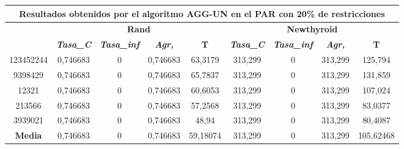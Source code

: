 \documentclass[12pt, spanish]{article}
\begin{document}
\begin{table}[H]
\footnotesize

\begin{tabular}{|c|c|c|c|c|c|c|c|c|}
\hline
\multicolumn{9}{|c|}{\textbf{Resultados obtenidos por el algoritmo AGG-UN en el PAR con 20\% de restricciones}}                                                                                                   \\ \hline
\multirow{2}{*}{} & \multicolumn{4}{c|}{\textbf{Rand}}                                                            & \multicolumn{4}{c|}{\textbf{Newthyroid}}                                                      \\ \cline{2-9} 
                  & \textit{\textbf{Tasa\_C}} & \textit{\textbf{Tasa\_inf}} & \textit{\textbf{Agr,}} & \textbf{T} & \textit{\textbf{Tasa\_C}} & \textit{\textbf{Tasa\_inf}} & \textit{\textbf{Agr,}} & \textbf{T} \\ \hline
123452244         & 0,746683                  & 0                           & 0,746683               & 63,3179    & 313,299                   & 0                           & 313,299                & 125,794    \\ \hline
9398429           & 0,746683                  & 0                           & 0,746683               & 65,7837    & 313,299                   & 0                           & 313,299                & 131,859    \\ \hline
12321             & 0,746683                  & 0                           & 0,746683               & 60,6053    & 313,299                   & 0                           & 313,299                & 107,024    \\ \hline
213566            & 0,746683                  & 0                           & 0,746683               & 57,2568    & 313,299                   & 0                           & 313,299                & 83,0377    \\ \hline
3939021           & 0,746683                  & 0                           & 0,746683               & 48,94      & 313,299                   & 0                           & 313,299                & 80,4087    \\ \hline
\textbf{Media}    & 0,746683                  & 0                           & 0,746683               & 59,18074   & 313,299                   & 0                           & 313,299                & 105,62468  \\ \hline
\end{tabular}
\end{table}
\end{document}
